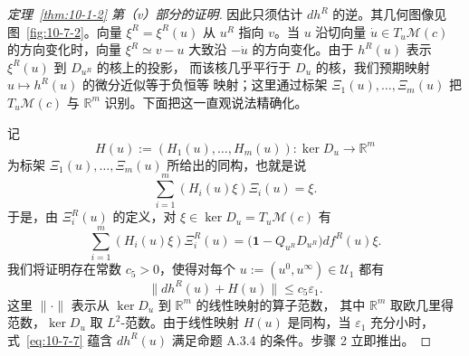 \begin{proof}[定理~\ref{thm:10-1-2} 第（v）部分的证明]
因此只须估计 $dh^R$ 的逆。其几何图像见图~\ref{fig:10-7-2}。向量
$\xi^R=\xi^R(u)$ 从 $u^R$ 指向 $v$。当 $u$ 沿切向量
$\dot u\in T_u\mathcal M(c)$ 的方向变化时，向量 $\xi^R\simeq v-u$ 大致沿
$-\dot u$ 的方向变化。由于 $h^R(u)$ 表示 $\xi^R(u)$ 到 $D_{u^R}$ 的核上的投影，
而该核几乎平行于 $D_u$ 的核，我们预期映射 $u\mapsto h^R(u)$ 的微分近似等于负恒等
映射；这里通过标架 $\Xi_1(u),\ldots,\Xi_m(u)$ 把
$T_u\mathcal M(c)$ 与 $\mathbb R^m$ 识别。下面把这一直观说法精确化。

记
\[
  H(u):=(H_1(u),\ldots,H_m(u)):\ker D_u\longrightarrow\mathbb R^m
\]
为标架 $\Xi_1(u),\ldots,\Xi_m(u)$ 所给出的同构，也就是说
\[
  \sum_{i=1}^m(H_i(u)\xi)\Xi_i(u)=\xi.
\]
于是，由 $\Xi_i^R(u)$ 的定义，对 $\xi\in\ker D_u=T_u\mathcal M(c)$ 有
\[
  \sum_{i=1}^m(H_i(u)\xi)\Xi_i^R(u)
  =\bigl(\mathbf 1-Q_{u^R}D_{u^R}\bigr)df^R(u)\xi.
\]
我们将证明存在常数 $c_5>0$，使得对每个
$u:=(u^0,u^\infty)\in\mathcal U_1$ 都有
\begin{equation}\label{eq:10-7-7}
  \lVert dh^R(u)+H(u)\rVert\leq c_5\varepsilon_1.
\end{equation}
这里 $\lVert\cdot\rVert$ 表示从 $\ker D_u$ 到 $\mathbb R^m$ 的线性映射的算子范数，
其中 $\mathbb R^m$ 取欧几里得范数，$\ker D_u$ 取 $L^2$-范数。由于线性映射
$H(u)$ 是同构，当 $\varepsilon_1$ 充分小时，式~\eqref{eq:10-7-7} 蕴含
$dh^R(u)$ 满足命题 A.3.4 的条件。步骤 2 立即推出。


\end{proof}
